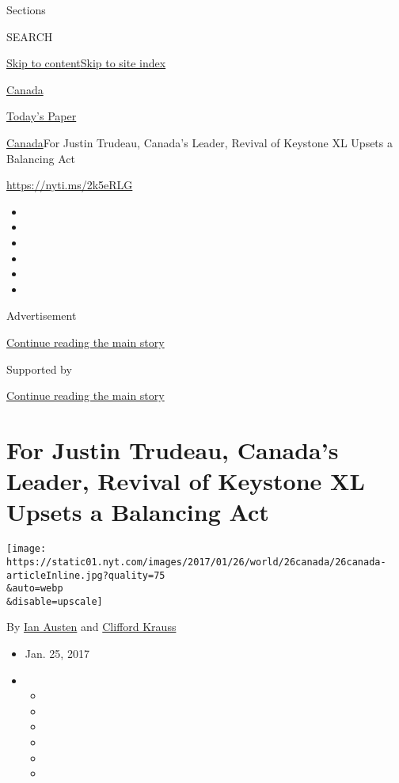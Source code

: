 Sections

SEARCH

\protect\hyperlink{site-content}{Skip to
content}\protect\hyperlink{site-index}{Skip to site index}

\href{https://www.nytimes.com/section/world/canada}{Canada}

\href{https://myaccount.nytimes.com/auth/login?response_type=cookie\&client_id=vi}{}

\href{https://www.nytimes.com/section/todayspaper}{Today's Paper}

\href{/section/world/canada}{Canada}\textbar{}For Justin Trudeau,
Canada's Leader, Revival of Keystone XL Upsets a Balancing Act

\url{https://nyti.ms/2k5eRLG}

\begin{itemize}
\item
\item
\item
\item
\item
\item
\end{itemize}

Advertisement

\protect\hyperlink{after-top}{Continue reading the main story}

Supported by

\protect\hyperlink{after-sponsor}{Continue reading the main story}

\hypertarget{for-justin-trudeau-canadas-leader-revival-of-keystone-xl-upsets-a-balancing-act}{%
\section{For Justin Trudeau, Canada's Leader, Revival of Keystone XL
Upsets a Balancing
Act}\label{for-justin-trudeau-canadas-leader-revival-of-keystone-xl-upsets-a-balancing-act}}

\texttt{[image: https://static01.nyt.com/images/2017/01/26/world/26canada/26canada-articleInline.jpg?quality=75\\\&auto=webp\\\&disable=upscale]}

By \href{http://www.nytimes.com/by/ian-austen}{Ian Austen} and
\href{http://www.nytimes.com/by/clifford-krauss}{Clifford Krauss}

\begin{itemize}
\item
  Jan. 25, 2017
\item
  \begin{itemize}
  \item
  \item
  \item
  \item
  \item
  \item
  \end{itemize}
\end{itemize}

